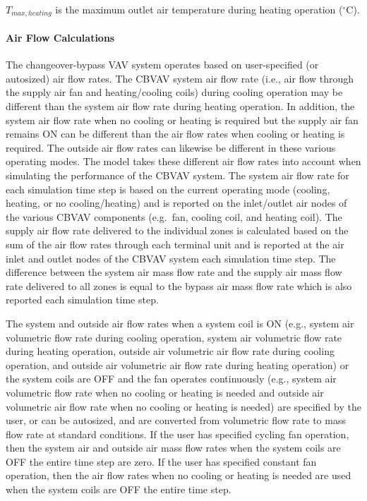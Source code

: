 \({T_{max,heating}}\) is the maximum outlet air temperature during heating operation (\(^{\circ}\)C).

\paragraph{Air Flow Calculations}\label{air-flow-calculations}

The changeover-bypass VAV system operates based on user-specified (or autosized) air flow rates. The CBVAV system air flow rate (i.e., air flow through the supply air fan and heating/cooling coils) during cooling operation may be different than the system air flow rate during heating operation. In addition, the system air flow rate when no cooling or heating is required but the supply air fan remains ON can be different than the air flow rates when cooling or heating is required. The outside air flow rates can likewise be different in these various operating modes. The model takes these different air flow rates into account when simulating the performance of the CBVAV system. The system air flow rate for each simulation time step is based on the current operating mode (cooling, heating, or no cooling/heating) and is reported on the inlet/outlet air nodes of the various CBVAV components (e.g.~fan, cooling coil, and heating coil). The supply air flow rate delivered to the individual zones is calculated based on the sum of the air flow rates through each terminal unit and is reported at the air inlet and outlet nodes of the CBVAV system each simulation time step. The difference between the system air mass flow rate and the supply air mass flow rate delivered to all zones is equal to the bypass air mass flow rate which is also reported each simulation time step.

The system and outside air flow rates when a system coil is ON (e.g., system air volumetric flow rate during cooling operation, system air volumetric flow rate during heating operation, outside air volumetric air flow rate during cooling operation, and outside air volumetric air flow rate during heating operation) or the system coils are OFF and the fan operates continuously (e.g., system air volumetric flow rate when no cooling or heating is needed and outside air volumetric air flow rate when no cooling or heating is needed) are specified by the user, or can be autosized, and are converted from volumetric flow rate to mass flow rate at standard conditions. If the user has specified cycling fan operation, then the system air and outside air mass flow rates when the system coils are OFF the entire time step are zero. If the user has specified constant fan operation, then the air flow rates when no cooling or heating is needed are used when the system coils are OFF the entire time step.

